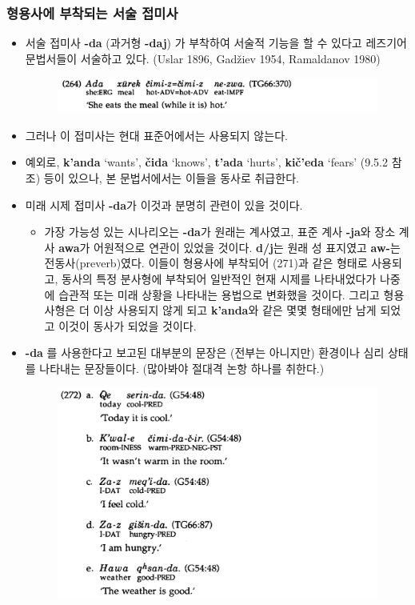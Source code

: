 \subsubsection{형용사에 부착되는 서술 접미사}
\begin{itemize}
\item 서술 접미사 \textbf{-da} (과거형 \textbf{-daj}) 가 부착하여 서술적 기능을 할 수 있다고 레즈기어 문법서들이 서술하고 있다. (Uslar 1896, Gadžiev 1954, Ramaldanov 1980)
\begin{figure}[H]
\centerline{\includegraphics[width=.8\linewidth]{Lezgian/src/ex264.png}}
\end{figure}
\item 그러나 이 접미사는 현대 표준어에서는 사용되지 않는다.
\item 예외로, \textbf{k'anda} `wants', \textbf{čida} `knows',  \textbf{t'ada} `hurts',  \textbf{kič'eda} `fears' (9.5.2 참조) 등이 있으나, 본 문법서에서는 이들을 동사로 취급한다.
\item 미래 시제 접미사 \textbf{-da}가 이것과 분명히 관련이 있을 것이다. 
\begin{itemize}
\item 가장 가능성 있는 시나리오는 \textbf{-da}가 원래는 계사였고, 표준 계사 \textbf{-ja}와 장소 계사 \textbf{awa}가 어원적으로 연관이 있었을 것이다. \textbf{d/j}는 원래 성 표지였고 \textbf{aw-}는 전동사(preverb)였다. 이들이 형용사에 부착되어 (271)과 같은 형태로 사용되고, 동사의 특정 분사형에 부착되어 일반적인 현재 시제를 나타내었다가 나중에 습관적 또는 미래 상황을 나타내는 용법으로 변화했을 것이다. 그리고 형용사형은 더 이상 사용되지 않게 되고 \textbf{k'anda}와 같은 몇몇 형태에만 남게 되었고 이것이 동사가 되었을 것이다.
\end{itemize}
\item  \textbf{-da} 를 사용한다고 보고된 대부분의 문장은 (전부는 아니지만) 환경이나 심리 상태를 나타내는 문장들이다. (많아봐야 절대격 논항 하나를 취한다.)
\begin{figure}[H]
\centerline{\includegraphics[width=.8\linewidth]{Lezgian/src/ex272.png}}
\end{figure}


\end{itemize}
